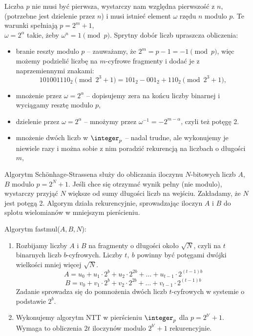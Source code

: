 Liczba \( p \) nie musi być pierwsza, wystarczy nam względna pierwszość z \( n \), (potrzebne jest dzielenie przez \( n \)) i musi istnieć element \( \omega \) rzędu \( n \) modulo \( p \).
Te warunki spełniają \( p = 2^m + 1 \), \\ \( \omega = 2^{\alpha} \) takie, żeby \( \omega^n = 1 \pmod{p} \). Sprytny dobór liczb upraszcza obliczenia:
\begin{itemize}
    \item branie reszty modulo \( p \) -- zauważamy, że \( 2^m = p - 1 = -1 \pmod{p} \), więc możemy podzielić liczbę na \( m \)-cyfrowe fragmenty i dodać je z naprzemiennymi znakami:
    \[
        101001110_2 \pmod{2^3 + 1} = 101_2 - 001_2 + 110_2 \pmod{2^3 + 1},
    \]
    \item mnożenie przez \( \omega = 2^{\alpha} \) -- dopisujemy zera na końcu liczby binarnej i wyciągamy resztę modulo \( p \),
    \item dzielenie przez \( \omega = 2^{\alpha} \) -- mnożymy przez \( \omega^{-1} = -2^{m-\alpha} \), czyli też potęgę 2.
    \item mnożenie dwóch liczb w \( \integer_p \) -- nadal trudne, ale wykonujemy je niewiele razy i można sobie z nim poradzić rekurencją na liczbach o długości \( m \),
\end{itemize}

Algorytm Sch{\"o}nhage-Strassena służy do obliczania iloczynu \( N \)-bitowych liczb \( A \), \( B \) modulo \( p = 2^N + 1 \).
Jeśli chce się otrzymać wynik pełny (nie modulo), wystarczy przyjąć \( N \) większe od sumy długości liczb na wejściu. Zakładamy, że \( N \) jest potęgą 2. Algorym działa rekurencyjnie, sprowadzając iloczyn \( A \) i \( B \) do splotu wielomianów w mniejszym pierścieniu.

\begin{greyframe}
    Algorytm fastmul(\( A, B, N \)):
    \begin{enumerate}
        \item Rozbijamy liczby \( A \) i \( B \) na fragmenty o długości około \( \sqrt{N} \), czyli na \( t \) binarnych liczb \( b \)-cyfrowych. Liczby \( t, \ b \) powinny być potęgami dwójki wielkości mniej więcej \( \sqrt{N} \).
        \[
            A = u_0 + u_1 \cdot 2^b + u_2 \cdot 2^{2b} + \ldots + u_{t-1} \cdot  2^{(t-1)b}
        \]
        \[
            B = v_0 + v_1 \cdot 2^b + v_2 \cdot 2^{2b} + \ldots + v_{t-1} \cdot 2^{(t-1)b}
        \]
        Zadanie sprowadza się do pomnożenia dwóch liczb \( t \)-cyfrowych w systemie o podstawie \( 2^b \).

        \item Wykonujemy algorytm NTT w pierścieniu \( \integer_p \) dla \( p = 2^{b'} + 1 \). Wymaga to obliczenia \( 2t \) iloczynów modulo \( 2^{b'} + 1 \) rekurencyjnie.
    \end{enumerate}
\end{greyframe}

